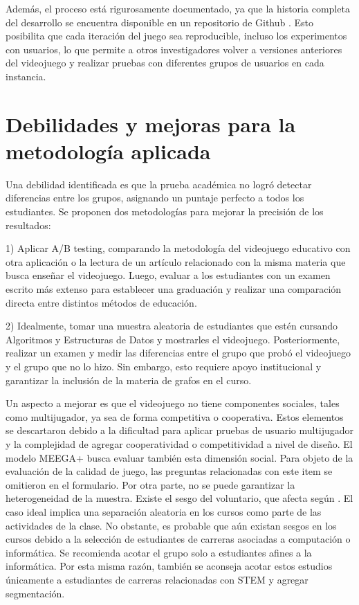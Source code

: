 Además, el proceso está rigurosamente documentado, ya que la historia completa del desarrollo se encuentra disponible en un repositorio de Github \cite{GithubRepo}. Esto posibilita que cada iteración del juego sea reproducible, incluso los experimentos con usuarios, lo que permite a otros investigadores volver a versiones anteriores del videojuego y realizar pruebas con diferentes grupos de usuarios en cada instancia.

\section{Debilidades y mejoras para la metodología aplicada}

Una debilidad identificada es que la prueba académica no logró detectar diferencias entre los grupos, asignando un puntaje perfecto a todos los estudiantes. Se proponen dos metodologías para mejorar la precisión de los resultados:

1) Aplicar A/B testing, comparando la metodología del videojuego educativo con otra aplicación o la lectura de un artículo relacionado con la misma materia que busca enseñar el videojuego. Luego, evaluar a los estudiantes con un examen escrito más extenso para establecer una graduación y realizar una comparación directa entre distintos métodos de educación.

2) Idealmente, tomar una muestra aleatoria de estudiantes que estén cursando Algoritmos y Estructuras de Datos y mostrarles el videojuego. Posteriormente, realizar un examen y medir las diferencias entre el grupo que probó el videojuego y el grupo que no lo hizo. Sin embargo, esto requiere apoyo institucional y garantizar la inclusión de la materia de grafos en el curso.

Un aspecto a mejorar es que el videojuego no tiene componentes sociales, tales como multijugador, ya sea de forma competitiva o cooperativa. Estos elementos se descartaron debido a la dificultad para aplicar pruebas de usuario multijugador y la complejidad de agregar cooperatividad o competitividad a nivel de diseño. El modelo MEEGA+ \cite{meegaplus} busca evaluar también esta dimensión social. Para objeto de la evaluación de la calidad de juego, las preguntas relacionadas con este item se omitieron en el formulario.
Por otra parte, no se puede garantizar la heterogeneidad de la muestra. Existe el sesgo del voluntario, que afecta según \cite{volunterBias}. El caso ideal implica una separación aleatoria en los cursos como parte de las actividades de la clase. No obstante, es probable que aún existan sesgos en los cursos debido a la selección de estudiantes de carreras asociadas a computación o informática. Se recomienda acotar el grupo solo a estudiantes afines a la informática. Por esta misma razón, también se aconseja acotar estos estudios únicamente a estudiantes de carreras relacionadas con STEM y agregar segmentación.

